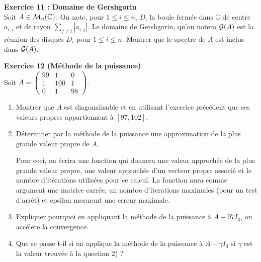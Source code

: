 \documentclass[10pt,a4paper]{article}
\newcommand{\C}{\mathbb C}
\def\ds{\displaystyle}
\def\1{{\rm 1\kern-.8ex 1}}
\begin{document}
{\bf Exercice 11 : Domaine de Gershgorin}\\
Soit $A\in {\cal M}_n(\C)$.
On note, pour $1\leq i\leq n$, $D_i$ la boule fermée dans $\C$ de 
centre $a_{i,i}$ et de rayon $\ds\sum_{j\not= i}|a_{i,j}|$.
Le domaine de Gershgorin, qu'on notera ${\cal G}(A)$ est la réunion des 
disques $D_i$ pour $1\leq i\leq n$.
Montrer que le spectre de $A$ est inclus dans ${\cal G}(A)$.

{\bf Exercice 12  (Méthode de la puissance)}\\
Soit $A=\left(\begin{array}{ccc}99&1&0\\1&100&1\\0&1&98\end{array}\right)$.
\begin{enumerate}
 \item Montrer que $A$ est diagonalisable et en utilisant l'exercice 
précédent que ses valeurs propres appartiennent à $[97,102]$.
\item Déterminer par la méthode de la puissance
une approximation de la plus grande valeur propre de $A$.

Pour ceci, on écrira une fonction qui donnera une valeur approchée 
de la plus grande valeur propre, une valeur approchée d'un 
vecteur propre associé et le nombre d'itérations utilisées 
pour ce calcul. La fonction aura comme argument une matrice carrée, 
un nombre d'iterations maximales (pour un test d'arrêt) 
et epsilon mesurant une erreur maximale.

\item Expliquer pourquoi en appliquant la méthode de la puissance à $A-97I_3$, 
on accélere la convergence.


\item Que se passe t-il si on applique la méthode de la puissance à 
$A-\gamma I_3$ si $\gamma$ est la valeur trouvée à la question 2) ?
\end{enumerate}
\end{document}
